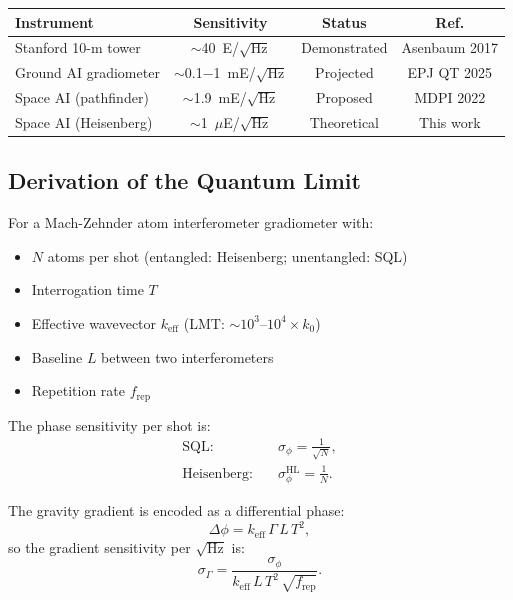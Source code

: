 \documentclass[11pt]{article}
\theoremstyle{definition}
\theoremstyle{remark}
\begin{document}
\begin{center}
\begin{tabular}{lccc}
\toprule
\textbf{Instrument} & \textbf{Sensitivity} & \textbf{Status} & \textbf{Ref.} \\
\midrule
Stanford 10-m tower & $\sim$40~E/$\sqrt{\text{Hz}}$ & Demonstrated & Asenbaum 2017 \\
Ground AI gradiometer & $\sim$0.1$-$1~mE/$\sqrt{\text{Hz}}$ & Projected & EPJ QT 2025 \\
Space AI (pathfinder) & $\sim$1.9~mE/$\sqrt{\text{Hz}}$ & Proposed & MDPI 2022 \\
Space AI (Heisenberg) & $\sim$1~$\mu$E/$\sqrt{\text{Hz}}$ & Theoretical & This work \\
\bottomrule
\end{tabular}
\end{center}

\subsection{Derivation of the Quantum Limit}

For a Mach-Zehnder atom interferometer gradiometer with:
\begin{itemize}
  \item $N$ atoms per shot (entangled: Heisenberg; unentangled: SQL)
  \item Interrogation time $T$
  \item Effective wavevector $k_{\text{eff}}$ (LMT: $\sim 10^3$--$10^4 \times k_0$)
  \item Baseline $L$ between two interferometers
  \item Repetition rate $f_{\text{rep}}$
\end{itemize}

The phase sensitivity per shot is:
\begin{align}
  \text{SQL:}& \quad \sigma_\phi = \frac{1}{\sqrt{N}}, \\
  \text{Heisenberg:}& \quad \sigma_\phi^{\text{HL}} = \frac{1}{N}.
\end{align}

The gravity gradient is encoded as a differential phase:
\begin{equation}
  \Delta\phi = k_{\text{eff}} \, \Gamma \, L \, T^2,
\end{equation}
so the gradient sensitivity per $\sqrt{\text{Hz}}$ is:
\begin{equation}
  \sigma_\Gamma = \frac{\sigma_\phi}{k_{\text{eff}} \, L \, T^2 \, \sqrt{f_{\text{rep}}}}.
\end{equation}
\end{document}
